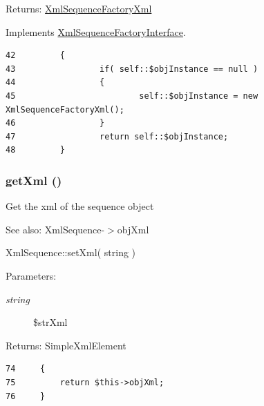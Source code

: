 \begin{Desc}
\item[Returns:]\hyperlink{class_xml_sequence_factory_xml}{XmlSequenceFactoryXml} \end{Desc}


Implements \hyperlink{interface_xml_sequence_factory_interface_c93fbec81f07e5d15f80db907e63dc10}{XmlSequenceFactoryInterface}.

\begin{Code}\begin{verbatim}42         {
43                 if( self::$objInstance == null )
44                 {
45                         self::$objInstance = new XmlSequenceFactoryXml();
46                 }
47                 return self::$objInstance;
48         }               
\end{verbatim}
\end{Code}


\hypertarget{class_xml_sequence_factory_xml_1ff0576538bf186559839cada0449ddf}{
\subsubsection[{getXml}]{\setlength{\rightskip}{0pt plus 5cm}getXml ()}}
\label{class_xml_sequence_factory_xml_1ff0576538bf186559839cada0449ddf}


Get the xml of the sequence object

\begin{Desc}
\item[See also:]XmlSequence-$>$objXml 

XmlSequence::setXml( string ) \end{Desc}
\begin{Desc}
\item[Parameters:]
\begin{description}
\item[{\em string}]\$strXml \end{description}
\end{Desc}
\begin{Desc}
\item[Returns:]SimpleXmlElement \end{Desc}


\begin{Code}\begin{verbatim}74     {
75         return $this->objXml;
76     }
\end{verbatim}
\end{Code}



